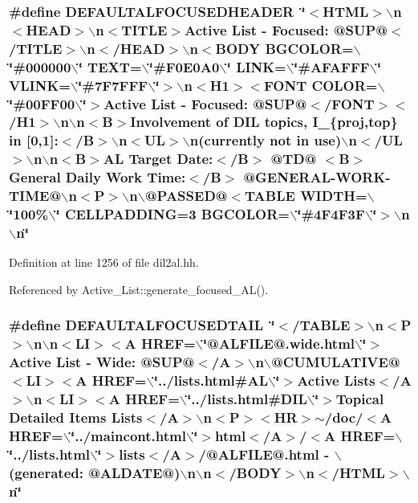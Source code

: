 \subsubsection{\setlength{\rightskip}{0pt plus 5cm}\#define DEFAULTALFOCUSEDHEADER\ \char`\"{}$<$HTML$>$$\backslash$n$<$HEAD$>$$\backslash$n$<$TITLE$>$Active List - Focused: @SUP@$<$/TITLE$>$$\backslash$n$<$/HEAD$>$$\backslash$n$<$BODY BGCOLOR=$\backslash$\char`\"{}\#000000$\backslash$\char`\"{} TEXT=$\backslash$\char`\"{}\#F0E0A0$\backslash$\char`\"{} LINK=$\backslash$\char`\"{}\#AFAFFF$\backslash$\char`\"{} VLINK=$\backslash$\char`\"{}\#7F7FFF$\backslash$\char`\"{}$>$$\backslash$n$<$H1$>$$<$FONT COLOR=$\backslash$\char`\"{}\#00FF00$\backslash$\char`\"{}$>$Active List - Focused: @SUP@$<$/FONT$>$$<$/H1$>$$\backslash$n$\backslash$n$<$B$>$Involvement of DIL topics, I\_\-\{proj,top\} in [0,1]:$<$/B$>$$\backslash$n$<$UL$>$$\backslash$n(currently not in use)$\backslash$n$<$/UL$>$$\backslash$n$\backslash$n$<$B$>$AL Target Date:$<$/B$>$ @TD@ $<$B$>$General Daily Work Time:$<$/B$>$ @GENERAL-WORK-TIME@$\backslash$n$<$P$>$$\backslash$n$\backslash$@PASSED@$<$TABLE WIDTH=$\backslash$\char`\"{}100\%$\backslash$\char`\"{} CELLPADDING=3 BGCOLOR=$\backslash$\char`\"{}\#4F4F3F$\backslash$\char`\"{}$>$$\backslash$n$\backslash$n\char`\"{}}\label{dil2al_8hh_a99}




Definition at line 1256 of file dil2al.hh.

Referenced by Active\_\-List::generate\_\-focused\_\-AL().
\subsubsection{\setlength{\rightskip}{0pt plus 5cm}\#define DEFAULTALFOCUSEDTAIL\ \char`\"{}$<$/TABLE$>$$\backslash$n$<$P$>$$\backslash$n$\backslash$n$<$LI$>$$<$A HREF=$\backslash$\char`\"{}@ALFILE@.wide.html$\backslash$\char`\"{}$>$Active List - Wide: @SUP@$<$/A$>$$\backslash$n$\backslash$@CUMULATIVE@$<$LI$>$$<$A HREF=$\backslash$\char`\"{}../lists.html\#AL$\backslash$\char`\"{}$>$Active Lists$<$/A$>$$\backslash$n$<$LI$>$$<$A HREF=$\backslash$\char`\"{}../lists.html\#DIL$\backslash$\char`\"{}$>$Topical Detailed Items Lists$<$/A$>$$\backslash$n$<$P$>$$<$HR$>$$\sim$/doc/$<$A HREF=$\backslash$\char`\"{}../maincont.html$\backslash$\char`\"{}$>$html$<$/A$>$/$<$A HREF=$\backslash$\char`\"{}../lists.html$\backslash$\char`\"{}$>$lists$<$/A$>$/@ALFILE@.html - $\backslash$(generated: @ALDATE@)$\backslash$n$\backslash$n$<$/BODY$>$$\backslash$n$<$/HTML$>$$\backslash$n\char`\"{}}\label{dil2al_8hh_a100}




